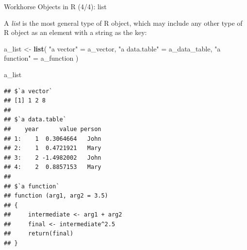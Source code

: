 \documentclass[10pt,ignorenonframetext,]{beamer}
\newenvironment{Shaded}{\begin{snugshade}}{\end{snugshade}}
\newcommand{\KeywordTok}[1]{\textcolor[rgb]{0.13,0.29,0.53}{\textbf{{#1}}}}
\newcommand{\StringTok}[1]{\textcolor[rgb]{0.31,0.60,0.02}{{#1}}}
\newcommand{\NormalTok}[1]{{#1}}
\begin{document}
\begin{frame}[fragile]{Workhorse Objects in R (4/4): list}

A \emph{list} is the most general type of R object, which may include
any other type of R object as an element with a string as the key:

\tiny

\begin{Shaded}
\begin{Highlighting}[]
\NormalTok{a_list <-}\StringTok{ }\KeywordTok{list}\NormalTok{(}
  \StringTok{"a vector"} \NormalTok{=}\StringTok{ }\NormalTok{a_vector,}
  \StringTok{"a data.table"} \NormalTok{=}\StringTok{ }\NormalTok{a_data_table,}
  \StringTok{"a function"} \NormalTok{=}\StringTok{ }\NormalTok{a_function}
\NormalTok{)}

\NormalTok{a_list}
\end{Highlighting}
\end{Shaded}

\begin{verbatim}
## $`a vector`
## [1] 1 2 8
## 
## $`a data.table`
##    year      value person
## 1:    1  0.3064664   John
## 2:    1  0.4721921   Mary
## 3:    2 -1.4982002   John
## 4:    2  0.8857153   Mary
## 
## $`a function`
## function (arg1, arg2 = 3.5) 
## {
##     intermediate <- arg1 + arg2
##     final <- intermediate^2.5
##     return(final)
## }
\end{verbatim}

\normalsize

\end{frame}
\end{document}
